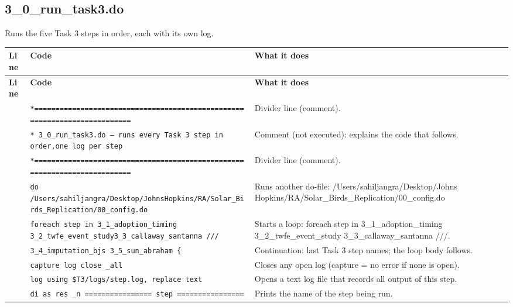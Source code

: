 \documentclass[10pt]{article}
\newcommand{\codetable}[1]{%
{\footnotesize
\begin{longtable}{>{\raggedleft\arraybackslash}p{0.55cm}>{\raggedright\arraybackslash}p{8.3cm}>{\raggedright\arraybackslash}p{8.0cm}}
\toprule \textbf{Line} & \textbf{Code} & \textbf{What it does}\\ \midrule \endfirsthead
\toprule \textbf{Line} & \textbf{Code} & \textbf{What it does}\\ \midrule \endhead
\bottomrule \endfoot
#1
\end{longtable}}}
\begin{document}
\subsection{3\_0\_run\_task3.do}
Runs the five Task 3 steps in order, each with its own log.

\codetable{1 & \texttt{*=========================================================\newline \hspace*{1em}=================} & Divider line (comment).\\
2 & \texttt{* 3\_0\_run\_task3.do  —  runs every Task 3 step in order,\newline \hspace*{1em}one log per step} & Comment (not executed): explains the code that follows.\\
3 & \texttt{*=========================================================\newline \hspace*{1em}=================} & Divider line (comment).\\
4 & \texttt{do \textquotedbl{}/Users/sahiljangra/Desktop/Johns\newline \hspace*{1em}Hopkins/RA/Solar\_Birds\_Replication/00\_config.do\textquotedbl{}} & Runs another do-file: /Users/sahiljangra/Desktop/Johns Hopkins/RA/Solar\_Birds\_Replication/00\_config.do\\
6 & \texttt{foreach step in 3\_1\_adoption\_timing 3\_2\_twfe\_event\_study\newline \hspace*{1em}3\_3\_callaway\_santanna ///} & Starts a loop: foreach step in 3\_1\_adoption\_timing 3\_2\_twfe\_event\_study 3\_3\_callaway\_santanna ///.\\
7 & \texttt{\hspace*{4.0em}3\_4\_imputation\_bjs 3\_5\_sun\_abraham \{} & Continuation: last Task 3 step names; the loop body follows.\\
8 & \texttt{\hspace*{2.0em}capture log close \_all} & Closes any open log (capture = no error if none is open).\\
9 & \texttt{\hspace*{2.0em}log using \textquotedbl{}\$T3/logs/\textasciigrave{}step\textquotesingle{}.log\textquotedbl{}, replace text} & Opens a text log file that records all output of this step.\\
10 & \texttt{\hspace*{2.0em}di as res \_n \textquotedbl{}================ \textasciigrave{}step\textquotesingle{} ================\textquotedbl{}} & Prints the name of the step being run.\\
}
\end{document}
